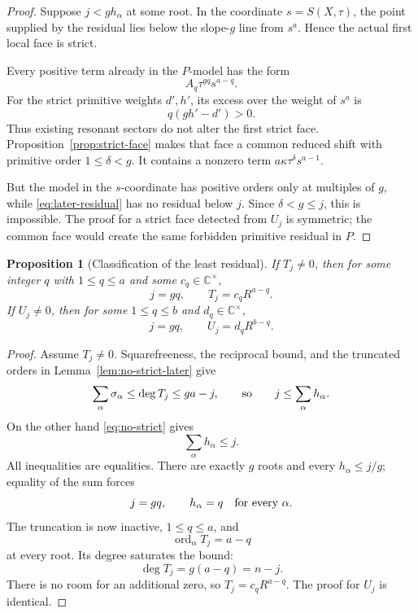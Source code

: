 \documentclass[11pt]{article}
\newtheorem{proposition}[theorem]{Proposition}
\theoremstyle{definition}
\theoremstyle{remark}
\newcommand{\C}{\mathbb C}
\newcommand{\ord}{\operatorname{ord}}
\begin{document}
\begin{proof}
Suppose \(j<gh_\alpha\) at some root.  In the coordinate
\(s=S(X,\tau)\), the point supplied by the residual lies below the
slope-\(g\) line from \(s^a\).  Hence the actual first local face is
strict.

Every positive term already in the \(P\)-model has the form
\[
 A_q\tau^{gq}s^{a-q}.
\]
For the strict primitive weights \(d',h'\), its excess over the weight
of \(s^a\) is
\[
 q(gh'-d')>0.
\]
Thus existing resonant sectors do not alter the first strict face.
Proposition~\ref{prop:strict-face} makes that face a common reduced
shift with primitive order \(1\leq\delta<g\).  It contains a nonzero
term \(a\kappa\tau^\delta s^{a-1}\).

But the model in the \(s\)-coordinate has positive orders only at
multiples of \(g\), while \eqref{eq:later-residual} has no residual
below \(j\).  Since \(\delta<g\leq j\), this is impossible.
The proof for a strict face detected from \(U_j\) is symmetric; the
common face would create the same forbidden primitive residual in
\(P\).
\end{proof}

\begin{proposition}[Classification of the least residual]
\label{prop:least-residual}
If \(T_j\neq0\), then for some integer \(q\) with \(1\leq q\leq a\)
and some \(c_q\in\C^\times\),
\begin{equation}
 j=gq,\qquad T_j=c_qR^{a-q}.
\label{eq:psector}
\end{equation}
If \(U_j\neq0\), then for some \(1\leq q\leq b\) and
\(d_q\in\C^\times\),
\begin{equation}
 j=gq,\qquad U_j=d_qR^{b-q}.
\label{eq:qsector}
\end{equation}
\end{proposition}

\begin{proof}
Assume \(T_j\neq0\).  Squarefreeness, the reciprocal bound, and the
truncated orders in Lemma~\ref{lem:no-strict-later} give
\[
 \sum_\alpha\sigma_\alpha
 \leq\deg T_j\leq ga-j,
\qquad\hbox{so}\qquad
 j\leq\sum_\alpha h_\alpha.
\]
On the other hand \eqref{eq:no-strict} gives
\[
 \sum_\alpha h_\alpha\leq j.
\]
All inequalities are equalities.  There are exactly \(g\) roots and
every \(h_\alpha\leq j/g\); equality of the sum forces
\[
 j=gq,\qquad h_\alpha=q\quad\hbox{for every }\alpha.
\]
The truncation is now inactive, \(1\leq q\leq a\), and
\[
 \ord_\alpha T_j=a-q
\]
at every root.  Its degree saturates the bound:
\[
 \deg T_j=g(a-q)=n-j.
\]
There is no room for an additional zero, so
\(T_j=c_qR^{a-q}\).  The proof for \(U_j\) is identical.
\end{proof}
\end{document}
